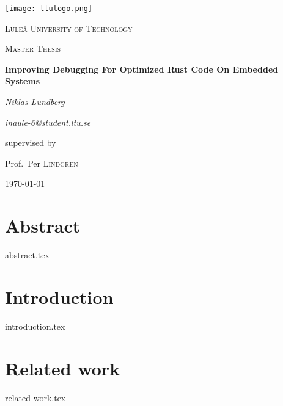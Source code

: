 \documentclass[12pt, a4paper]{book}
\begin{document}
%

\begin{titlepage}
    \centering
    \texttt{[image: ltulogo.png]}\par\vspace{1cm}
    {\scshape\LARGE Luleå University of Technology\par}
    \vspace{1cm}
    {\scshape\Large Master Thesis\par}
    \vspace{1.5cm}
    {\huge\bfseries Improving Debugging For Optimized Rust Code On Embedded Systems\par}
    \vspace{2cm}
    {\Large\textit{Niklas Lundberg}\par}
    {\Large\textit{inaule-6@student.ltu.se}\par}
    \vfill
    supervised by\par
    Prof.~Per \textsc{Lindgren}
    \vfill
    {\large \today\par}
\end{titlepage}


\chapter*{Abstract}
\label{sec:abstract}
{abstract.tex}

\tableofcontents 
\clearpage

\listoffigures
\clearpage

\listoftables
\clearpage

\chapter{Introduction}
\label{sec:introfuction}
{introduction.tex}

\chapter{Related work}
\label{sec:relatedwork}
{related-work.tex}
\end{document}
